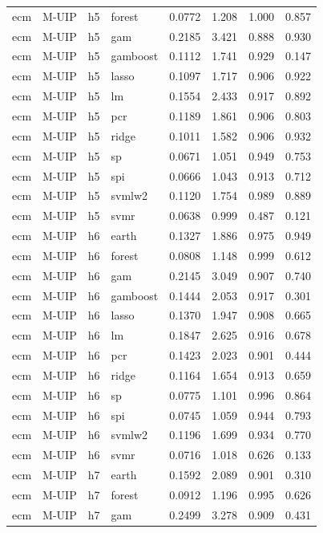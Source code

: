 \begin{ThreePartTable}
\begin{longtable}[t]{llclcccc}
ecm & M-UIP & h5 & forest & 0.0772 & 1.208 & 1.000 & 0.857\\
ecm & M-UIP & h5 & gam & 0.2185 & 3.421 & 0.888 & 0.930\\
ecm & M-UIP & h5 & gamboost & 0.1112 & 1.741 & 0.929 & 0.147\\
ecm & M-UIP & h5 & lasso & 0.1097 & 1.717 & 0.906 & 0.922\\
ecm & M-UIP & h5 & lm & 0.1554 & 2.433 & 0.917 & 0.892\\
ecm & M-UIP & h5 & pcr & 0.1189 & 1.861 & 0.906 & 0.803\\
ecm & M-UIP & h5 & ridge & 0.1011 & 1.582 & 0.906 & 0.932\\
ecm & M-UIP & h5 & sp & 0.0671 & 1.051 & 0.949 & 0.753\\
ecm & M-UIP & h5 & spi & 0.0666 & 1.043 & 0.913 & 0.712\\
ecm & M-UIP & h5 & svmlw2 & 0.1120 & 1.754 & 0.989 & 0.889\\
ecm & M-UIP & h5 & svmr & 0.0638 & 0.999 & 0.487 & 0.121\\
\addlinespace
ecm & M-UIP & h6 & earth & 0.1327 & 1.886 & 0.975 & 0.949\\
ecm & M-UIP & h6 & forest & 0.0808 & 1.148 & 0.999 & 0.612\\
ecm & M-UIP & h6 & gam & 0.2145 & 3.049 & 0.907 & 0.740\\
ecm & M-UIP & h6 & gamboost & 0.1444 & 2.053 & 0.917 & 0.301\\
ecm & M-UIP & h6 & lasso & 0.1370 & 1.947 & 0.908 & 0.665\\
ecm & M-UIP & h6 & lm & 0.1847 & 2.625 & 0.916 & 0.678\\
ecm & M-UIP & h6 & pcr & 0.1423 & 2.023 & 0.901 & 0.444\\
ecm & M-UIP & h6 & ridge & 0.1164 & 1.654 & 0.913 & 0.659\\
ecm & M-UIP & h6 & sp & 0.0775 & 1.101 & 0.996 & 0.864\\
ecm & M-UIP & h6 & spi & 0.0745 & 1.059 & 0.944 & 0.793\\
ecm & M-UIP & h6 & svmlw2 & 0.1196 & 1.699 & 0.934 & 0.770\\
ecm & M-UIP & h6 & svmr & 0.0716 & 1.018 & 0.626 & 0.133\\
\addlinespace
ecm & M-UIP & h7 & earth & 0.1592 & 2.089 & 0.901 & 0.310\\
ecm & M-UIP & h7 & forest & 0.0912 & 1.196 & 0.995 & 0.626\\
ecm & M-UIP & h7 & gam & 0.2499 & 3.278 & 0.909 & 0.431\\

\end{longtable}
\end{ThreePartTable}
